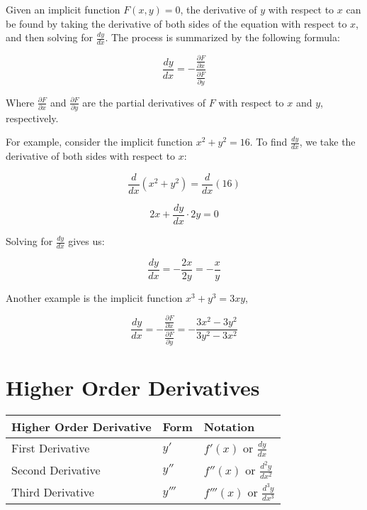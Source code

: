 Given an implicit function $F(x,y) = 0$, the derivative of $y$ with respect to $x$ can be found by taking the derivative of both sides of the equation with respect to $x$, and then solving for $\frac{dy}{dx}$. The process is summarized by the following formula:

$$\frac{dy}{dx} = -\frac{\frac{\partial F}{\partial x}}{\frac{\partial F}{\partial y}}$$

Where $\frac{\partial F}{\partial x}$ and $\frac{\partial F}{\partial y}$ are the partial derivatives of $F$ with respect to $x$ and $y$, respectively.

For example, consider the implicit function $x^2 + y^2 = 16$. To find $\frac{dy}{dx}$, we take the derivative of both sides with respect to $x$:

$$\frac{d}{dx}(x^2 + y^2) = \frac{d}{dx}(16)$$

$$2x + \frac{dy}{dx} \cdot 2y = 0$$

Solving for $\frac{dy}{dx}$ gives us:

$$\frac{dy}{dx} = -\frac{2x}{2y} = -\frac{x}{y}$$

Another example is the implicit function $x^3 + y^3 = 3xy$,

$$\frac{dy}{dx} = -\frac{\frac{\partial F}{\partial x}}{\frac{\partial F}{\partial y}} = -\frac{3x^2 - 3y^2}{3y^2 - 3x^2}$$


\section{Higher Order Derivatives}
\begin{table}[h]
  \centering
  \renewcommand{\arraystretch}{1.7}
  \begin{tabular}{p{5cm}p{3cm}p{3cm}}
  \toprule
  \textbf{Higher Order Derivative} & \textbf{Form} & \textbf{Notation} \\ \hline
  First Derivative & $y'$ & $f'(x)$ or $\frac{dy}{dx}$ \\ 
  \hline
  Second Derivative & $y''$ & $f''(x)$ or $\frac{d^2y}{dx^2}$ \\ 
  \hline
  Third Derivative & $y'''$ & $f'''(x)$ or $\frac{d^3y}{dx^3}$ \\ \bottomrule
  \end{tabular}
  \end{table}

